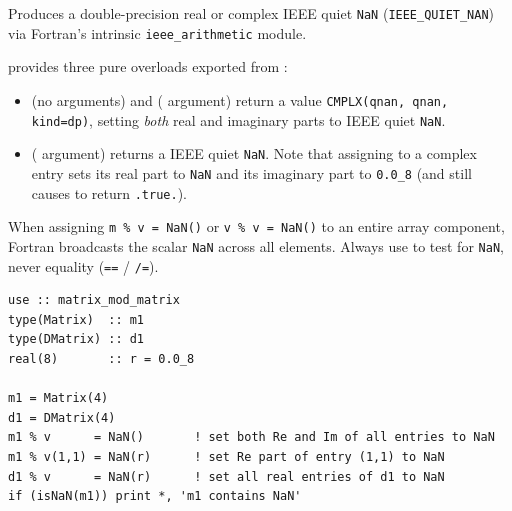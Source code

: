 Produces a double-precision real or complex IEEE quiet \texttt{NaN} (\texttt{IEEE\_QUIET\_NAN}) via Fortran's intrinsic \texttt{ieee\_arithmetic} module.

 provides three pure overloads exported from :
\begin{itemize}
  \item {} (no arguments) and  ( argument) return a  value \texttt{CMPLX(qnan, qnan, kind=dp)}, setting \emph{both} real and imaginary parts to IEEE quiet \texttt{NaN}.
  \item {} ( argument) returns a  IEEE quiet \texttt{NaN}. Note that assigning  to a complex entry sets its real part to \texttt{NaN} and its imaginary part to \texttt{0.0\_8} (and still causes  to return \texttt{.true.}).
\end{itemize}
When assigning \texttt{m \% v = NaN()} or \texttt{v \% v = NaN()} to an entire array component, Fortran broadcasts the scalar \texttt{NaN} across all elements. Always use  to test for \texttt{NaN}, never equality (\texttt{==} / \texttt{/=}).

\begin{description}[leftmargin=2.2cm, style=nextline]
\end{description}

\lstset{language=[95]Fortran}
\begin{lstlisting}
use :: matrix_mod_matrix
type(Matrix)  :: m1
type(DMatrix) :: d1
real(8)       :: r = 0.0_8

m1 = Matrix(4)
d1 = DMatrix(4)
m1 % v      = NaN()       ! set both Re and Im of all entries to NaN
m1 % v(1,1) = NaN(r)      ! set Re part of entry (1,1) to NaN
d1 % v      = NaN(r)      ! set all real entries of d1 to NaN
if (isNaN(m1)) print *, 'm1 contains NaN'
\end{lstlisting}
